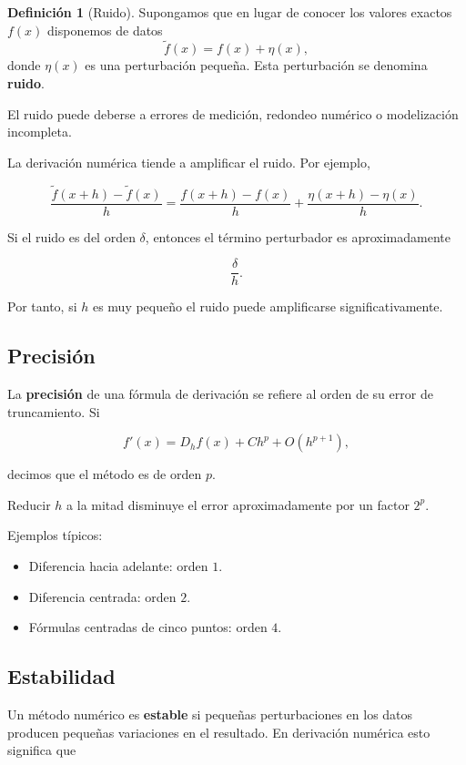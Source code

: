 \documentclass[12pt,a4paper]{article}
\theoremstyle{definition}
\newtheorem{definicion}[teorema]{Definición}
\theoremstyle{remark}
\begin{document}
\begin{definicion}[Ruido]
Supongamos que en lugar de conocer los valores exactos $f(x)$ disponemos de datos
\[
\tilde f(x)=f(x)+\eta(x),
\]
donde $\eta(x)$ es una perturbación pequeña. Esta perturbación se denomina
\textbf{ruido}.
\end{definicion}

El ruido puede deberse a errores de medición, redondeo numérico o
modelización incompleta.

La derivación numérica tiende a amplificar el ruido. Por ejemplo,

\[
\frac{\tilde f(x+h)-\tilde f(x)}{h}
=
\frac{f(x+h)-f(x)}{h}
+
\frac{\eta(x+h)-\eta(x)}{h}.
\]

Si el ruido es del orden $\delta$, entonces el término perturbador es
aproximadamente

\[
\frac{\delta}{h}.
\]

Por tanto, si $h$ es muy pequeño el ruido puede amplificarse significativamente.

\subsection{Precisión}

La \textbf{precisión} de una fórmula de derivación se refiere al orden de su error
de truncamiento. Si

\[
f'(x)=D_h f(x)+Ch^p+O(h^{p+1}),
\]

decimos que el método es de orden $p$.

Reducir $h$ a la mitad disminuye el error aproximadamente por un factor $2^p$.

Ejemplos típicos:

\begin{itemize}
\item Diferencia hacia adelante: orden $1$.
\item Diferencia centrada: orden $2$.
\item Fórmulas centradas de cinco puntos: orden $4$.
\end{itemize}

\subsection{Estabilidad}

Un método numérico es \textbf{estable} si pequeñas perturbaciones en los datos
producen pequeñas variaciones en el resultado. En derivación numérica esto
significa que
\end{document}
